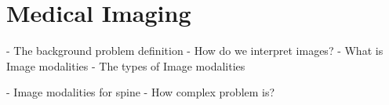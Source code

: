 \chapter{Medical Imaging}
\label{ch:rworks}


- The background problem definition
- How do we interpret images?
    - What is Image modalities
	- The types of Image modalities

- Image modalities for spine
- How complex problem is?  
